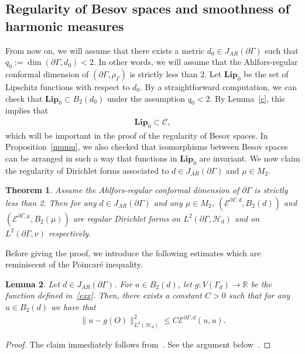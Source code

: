\documentclass[10pt]{amsart}
\newtheorem{theo}{Theorem}[section]
\newtheorem{lemm}[theo]{Lemma}\newtheorem{prop}[theo]{Proposition}\newtheorem{coro}[theo]{Corollary}\newtheorem{conj}[theo]{Conjecture}
\theoremstyle{definition}\newtheorem{defi}[theo]{Definition}\newtheorem{rema}[theo]{Remark}\newtheorem{exam}[theo]{Example}\newtheorem{exem}[theo]{Example}\newtheorem{nota}[theo]{Notation}
\newcommand{\ce}{\mathcal{E}}
\newcommand{\ch}{\mathcal{H}}
\newcommand{\cC}{\mathcal{C}}
\newcommand{\br}{\mathbb{R}}
\newcommand{\bfLip}{\mathbf{Lip}}
\begin{document}
\subsection{Regularity of Besov spaces and smoothness of harmonic measures}\label{subsec:regu}
From now on, we will assume that there exists a metric $d_0\in J_{AR}(\partial\Gamma)$ such that $q_0:=\dim(\partial\Gamma,d_0)<2$. In other words, we will assume that the Ahlfors-regular conformal dimension of $(\partial\Gamma,\rho_{\Gamma})$ is strictly less than 2. Let $\bfLip_0$ be the set of Lipschitz functions with respect to $d_0$. By a straightforward computation, we can check that $\bfLip_0\subset B_2(d_0)$ under the assumption $q_0<2$. By Lemma~\ref{c}, this implies that
\begin{align}\label{0=c}
\bfLip_0\subset\cC,
\end{align}
which will be important in the proof of the regularity of Besov spaces. In Proposition~\ref{mumu}, we also checked that isomorphisms between Besov spaces can be arranged in such a way that functions in $\bfLip_0$ are invariant. We now claim the regularity of Dirichlet forms associated to $d\in J_{AR}(\partial\Gamma)$ and $\mu\in M_2$.

\begin{theo}\label{reg}
Assume the Ahlfors-regular conformal dimension of $\partial\Gamma$ is strictly less than 2. Then for any $d\in J_{AR}(\partial\Gamma)$ and any $\mu\in M_2$, $(\ce^{\partial\Gamma,d},B_2(d))$ and $(\ce^{\partial\Gamma,\mu},B_2(\mu))$ are regular Dirichlet forms on $L^2(\partial\Gamma,\ch_{d})$ and on $L^2(\partial\Gamma,\nu)$ respectively.
\end{theo}

Before giving the proof, we introduce the following estimates which are reminiscent of the Poincaré inequality.
\begin{lemm}\label{bpoin}
Let $d\in J_{AR}(\partial\Gamma)$. For $u\in B_2(d)$, let $g:V(\Gamma_{d})\rightarrow\br$ be the function defined in~\eqref{exx}. Then, there exists a constant $C>0$ such that for any $u\in B_2(d)$ we have that
\begin{align*}
\|u-g(O)\|^2_{L^2(\ch_{d})}\leq C\ce^{\partial\Gamma,d}(u,u).
\end{align*}
\end{lemm}

\begin{proof}
The claim immediately follows from~\cite[Theorem~3.1 and Lemma~3.2]{BP}. See the argument below~\cite[Lemma~3.2]{BP}.
\end{proof}
\end{document}
